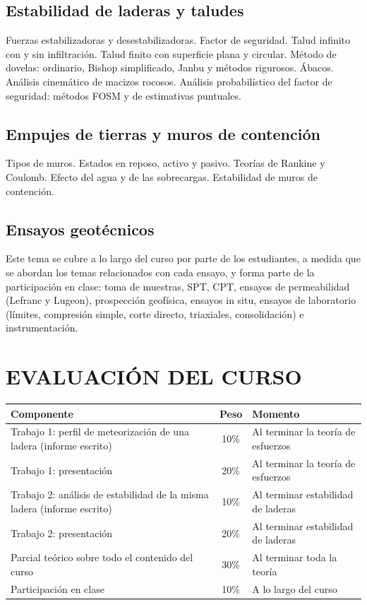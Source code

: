 \documentclass[a4paper,twoside,11pt]{article}
\begin{document}
\subsection{Estabilidad de laderas y taludes}
Fuerzas estabilizadoras y desestabilizadoras. Factor de seguridad. Talud infinito con y sin
infiltración. Talud finito con superficie plana y circular. Método de dovelas: ordinario, Bishop
simplificado, Janbu y métodos rigurosos. Ábacos. Análisis cinemático de macizos rocosos. Análisis
probabilístico del factor de seguridad: métodos FOSM y de estimativas puntuales.

\subsection{Empujes de tierras y muros de contención}
Tipos de muros. Estados en reposo, activo y pasivo. Teorías de Rankine y Coulomb. Efecto del agua y de
las sobrecargas. Estabilidad de muros de contención.

\subsection*{Ensayos geotécnicos}
Este tema se cubre a lo largo del curso por parte de los estudiantes, a medida que se abordan los temas
relacionados con cada ensayo, y forma parte de la participación en clase: toma de muestras, SPT, CPT,
ensayos de permeabilidad (Lefranc y Lugeon), prospección geofísica, ensayos in situ, ensayos de
laboratorio (límites, compresión simple, corte directo, triaxiales, consolidación) e instrumentación.

\section{EVALUACIÓN DEL CURSO}
\begin{center}
\begin{tabular}{p{8.5cm}cp{4.5cm}}
\toprule
Componente & Peso & Momento \\
\midrule
Trabajo 1: perfil de meteorización de una ladera (informe escrito) & 10\% & Al terminar la teoría de esfuerzos \\
Trabajo 1: presentación & 20\% & Al terminar la teoría de esfuerzos \\
Trabajo 2: análisis de estabilidad de la misma ladera (informe escrito) & 10\% & Al terminar estabilidad de laderas \\
Trabajo 2: presentación & 20\% & Al terminar estabilidad de laderas \\
Parcial teórico sobre todo el contenido del curso & 30\% & Al terminar toda la teoría \\
Participación en clase & 10\% & A lo largo del curso \\
\bottomrule
\end{tabular}
\end{center}
\end{document}
